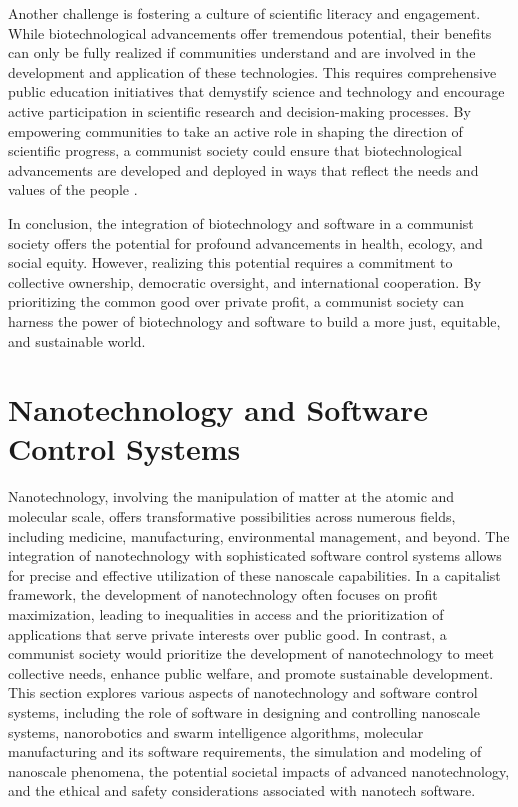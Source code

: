 Another challenge is fostering a culture of scientific literacy and engagement. While biotechnological advancements offer tremendous potential, their benefits can only be fully realized if communities understand and are involved in the development and application of these technologies. This requires comprehensive public education initiatives that demystify science and technology and encourage active participation in scientific research and decision-making processes. By empowering communities to take an active role in shaping the direction of scientific progress, a communist society could ensure that biotechnological advancements are developed and deployed in ways that reflect the needs and values of the people \cite[pp.~510-515]{johnson2021literacy}.

In conclusion, the integration of biotechnology and software in a communist society offers the potential for profound advancements in health, ecology, and social equity. However, realizing this potential requires a commitment to collective ownership, democratic oversight, and international cooperation. By prioritizing the common good over private profit, a communist society can harness the power of biotechnology and software to build a more just, equitable, and sustainable world.

\section{Nanotechnology and Software Control Systems}

Nanotechnology, involving the manipulation of matter at the atomic and molecular scale, offers transformative possibilities across numerous fields, including medicine, manufacturing, environmental management, and beyond. The integration of nanotechnology with sophisticated software control systems allows for precise and effective utilization of these nanoscale capabilities. In a capitalist framework, the development of nanotechnology often focuses on profit maximization, leading to inequalities in access and the prioritization of applications that serve private interests over public good. In contrast, a communist society would prioritize the development of nanotechnology to meet collective needs, enhance public welfare, and promote sustainable development. This section explores various aspects of nanotechnology and software control systems, including the role of software in designing and controlling nanoscale systems, nanorobotics and swarm intelligence algorithms, molecular manufacturing and its software requirements, the simulation and modeling of nanoscale phenomena, the potential societal impacts of advanced nanotechnology, and the ethical and safety considerations associated with nanotech software.

